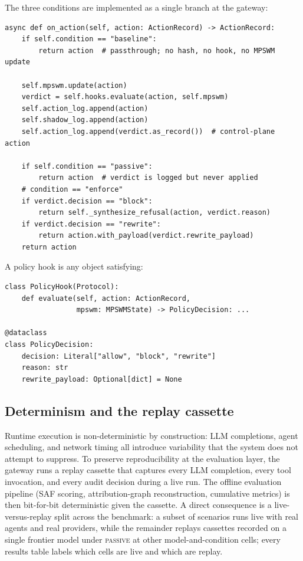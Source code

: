 \documentclass{article}
\begin{document}
The three conditions are implemented as a single branch at the gateway:

\begin{verbatim}
async def on_action(self, action: ActionRecord) -> ActionRecord:
    if self.condition == "baseline":
        return action  # passthrough; no hash, no hook, no MPSWM update

    self.mpswm.update(action)
    verdict = self.hooks.evaluate(action, self.mpswm)
    self.action_log.append(action)
    self.shadow_log.append(action)
    self.action_log.append(verdict.as_record())  # control-plane action

    if self.condition == "passive":
        return action  # verdict is logged but never applied
    # condition == "enforce"
    if verdict.decision == "block":
        return self._synthesize_refusal(action, verdict.reason)
    if verdict.decision == "rewrite":
        return action.with_payload(verdict.rewrite_payload)
    return action
\end{verbatim}

A policy hook is any object satisfying:

\begin{verbatim}
class PolicyHook(Protocol):
    def evaluate(self, action: ActionRecord,
                 mpswm: MPSWMState) -> PolicyDecision: ...

@dataclass
class PolicyDecision:
    decision: Literal["allow", "block", "rewrite"]
    reason: str
    rewrite_payload: Optional[dict] = None
\end{verbatim}

\subsection{Determinism and the replay cassette}
\label{sec:appendix:system:determinism}

Runtime execution is non-deterministic by construction: LLM completions, agent scheduling, and network timing all introduce variability that the system does not attempt to suppress. To preserve reproducibility at the evaluation layer, the gateway runs a replay cassette that captures every LLM completion, every tool invocation, and every audit decision during a live run. The offline evaluation pipeline (SAF scoring, attribution-graph reconstruction, cumulative metrics) is then bit-for-bit deterministic given the cassette. A direct consequence is a live-versus-replay split across the benchmark: a subset of scenarios runs live with real agents and real providers, while the remainder replays cassettes recorded on a single frontier model under \textsc{passive} at other model-and-condition cells; every results table labels which cells are live and which are replay.
\end{document}
